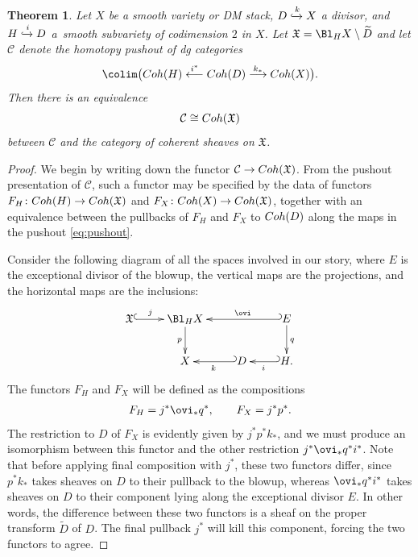 \documentclass[11pt]{article}
\numberwithin{equation}{section}
\numberwithin{equation}{section}
\newtheorem{Theorem}{Theorem}[section]
\def\cC{\mathcal{C}}
\newcommand\frX{\mathfrak{X}}
\newcommand{\Coh}{\textup{Coh}}
\begin{document}
\begin{Theorem}\label{thm:main-general}
	Let $X$ be a smooth variety or DM stack, $D\xhookrightarrow{k} X$ a divisor, and $H\xhookrightarrow{i}D$ a~smooth subvariety of codimension $2$ in $X$. Let $\frX = \Bl_HX\setminus \widetilde{D}$ and let $\cC$ denote the
homotopy pushout of dg categories
\begin{equation}\label{eq:pushout}
\colim\bigl(\Coh(H)\stackrel{i^*}\longleftarrow\Coh(D)\stackrel{k_*}\longrightarrow\Coh(X)\bigr).
\end{equation}
Then there is an equivalence
\[
\cC\cong\Coh(\frX)
\] between $\cC$ and the category of coherent sheaves on $\frX$.
\end{Theorem}
\begin{proof}
We begin by writing down the functor $\cC\to \Coh(\frX)$. From the pushout presentation of $\cC$, such a functor may be specified by the data of functors $F_H\colon \Coh(H)\to \Coh(\frX)$ and $F_X\colon \Coh(X)\to\Coh(\frX)$, together with an equivalence between the pullbacks of $F_H$ and $F_X$ to $\Coh(D)$ along the maps in the pushout \eqref{eq:pushout}.

Consider the following diagram of all the spaces involved in our story, where $E$ is the exceptional divisor of the blowup, the vertical maps are the projections, and the horizontal maps are the inclusions:
\[
\xymatrix{
\frX\ar@{^{(}->}[r]^-j & \Bl_HX\ar[d]_p & &E\ar@{_{(}->}[ll]_-{\ovi}\ar[d]^q\\
& X & D\ar@{_{(}->}[l]^k & H.\ar@{_{(}->}[l]^-i
}
\]
The functors $F_H$ and $F_X$ will be defined as the compositions
\begin{gather*}
F_H = j^*\ovi_* q^*, \qquad F_X = j^*p^*.
\end{gather*}
The restriction to $D$ of $F_X$ is evidently given by $j^*p^*k_*$, and we must produce an isomorphism between this functor and the other restriction $j^*\ovi_*q^*i^*$. Note that before applying final composition with $j^*$, these two functors differ, since $p^*k_*$ takes sheaves on $D$ to their pullback to the blowup, whereas $\ovi_* q^*i^*$ takes sheaves on $D$ to their component lying along the exceptional divisor $E$. In other words, the difference between these two functors is a sheaf on the proper transform $\widetilde{D}$ of $D$. The final pullback $j^*$ will kill this component, forcing the two functors to agree.


\end{proof}
\end{document}
